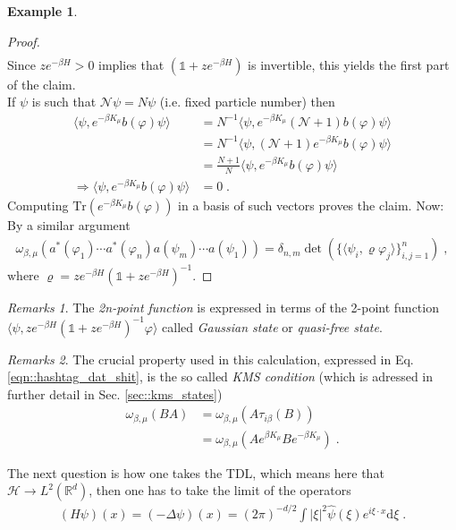 \documentclass[
a4paper, %
11pt, %
onecolumn, %
openany, %
]{memoir}
\theoremstyle{definition}
\newtheorem{example}{Example}[chapter]
\theoremstyle{remark}
\newtheorem{remarks}{Remarks}[chapter]
\theoremstyle{plain}
\begin{document}
\begin{example}
\begin{proof}
\begin{align}
	\end{align}
Since $ze^{-\beta H}>0$ implies that $(\mathds{1}+ze^{-\beta H})$ is invertible, this yields the first part of the claim.\\
	If $\psi$ is such that $\mathcal{N}\psi= N\psi$ (i.e. fixed particle number) then \begin{align}
	\langle \psi,e^{-\beta K_{\mu}}b(\varphi)\psi\rangle &={N}^{-1}\langle \psi , e^{-\beta K_{\mu}}(\mathcal{N}+1)b(\varphi)\psi\rangle\\
	&= N^{-1}\langle \psi, (\mathcal{N}+1)e^{-\beta K_{\mu}}b(\varphi)\psi\rangle\\
	&=\frac{N+1}{N}\langle \psi, e^{-\beta K_{\mu}}b(\varphi)\psi\rangle\\
	\Rightarrow \langle \psi,e^{-\beta K_{\mu}}b(\varphi)\psi\rangle&=0\; .
	\end{align}
	Computing $\mathrm{Tr}(e^{-\beta K_{\mu}}b(\varphi))$ in a basis of such vectors proves the claim. Now: By a similar argument \begin{align}
	\omega_{\beta,\mu}(a^*(\varphi_1)\cdots a^{*}(\varphi_n)a(\psi_m)\cdots a(\psi_1))=\delta_{n,m}\det\left(\{\langle\psi_i,\varrho\varphi_j\rangle\}_{i,j=1}^{n}\right)\; ,	\end{align}
$\text{where }\varrho = ze^{-\beta H}(\mathds{1}+ze^{-\beta H})^{-1}$.
\end{proof}
\end{example}
\begin{remarks}
	The \textit{2n-point function} is expressed in terms of the 2-point function $\langle \psi, ze^{-\beta H}(\mathds{1}+ze^{-\beta H})^{-1}\varphi\rangle$ called \textit{Gaussian state} or \textit{quasi-free state}.
\end{remarks}
\begin{remarks}
	The crucial property used in this calculation, expressed in Eq. \eqref{eqn::hashtag_dat_shit}, is the so called \textit{KMS condition} (which is adressed in further detail in Sec. \ref{sec::kms_states}) \begin{align}
	\omega_{\beta,\mu}(BA)&=\omega_{\beta,\mu}(A\tau_{i\beta}(B))\\
	&=\omega_{\beta,\mu}(Ae^{\beta K_{\mu}}Be^{-\beta K_{\mu}})\; .
	\end{align}
\end{remarks}
The next question is how one takes the TDL, which means here that $\mathcal{H}\rightarrow L^2(\mathbb{R}^d)$, then one has to take the limit of the operators \begin{align}
(H\psi)(x)=(-\Delta \psi)(x)=(2\pi)^{-d/2}\int |\xi|^2\hat{\psi}(\xi)e^{i\xi\cdot x}\mathrm{d}\xi\; .
\end{align}
\end{document}
